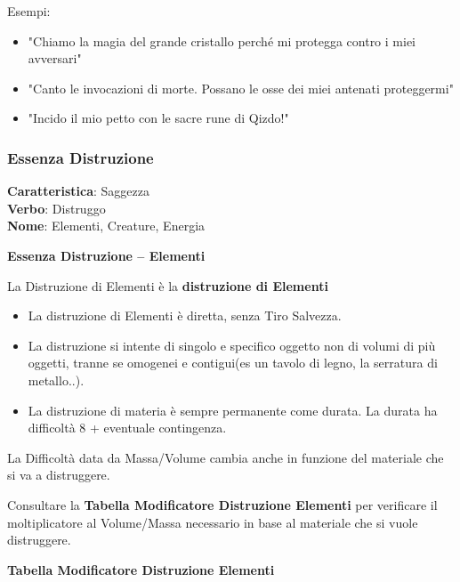 \documentclass[a4paper,10 pt,twoside,openany]{book}
\begin{document}
\bigskip

Esempi:
\begin{itemize}
	\item
	"Chiamo la magia del grande cristallo perché mi protegga contro i miei avversari"
	\item
	"Canto le invocazioni di morte. Possano le osse dei miei antenati proteggermi"
	\item
	"Incido il mio petto con le sacre rune di Qizdo!"
\end{itemize}

\pagebreak

\subsubsection{Essenza Distruzione}

\textbf{Caratteristica}: Saggezza\\
\textbf{Verbo}: Distruggo\\
\textbf{Nome}: Elementi, Creature, Energia\\

\label{essenza-distruzione---volonta}

\textbf{Essenza Distruzione -- Elementi}

La Distruzione di Elementi è la \textbf{distruzione di Elementi}
\begin{itemize}
	\item
	La distruzione di Elementi è diretta, senza Tiro Salvezza.
	\item
	La distruzione si intente di singolo e specifico oggetto non di volumi di più oggetti, tranne se omogenei e contigui(es un tavolo di legno, la serratura di metallo..).
	\item
	La distruzione di materia è sempre permanente come durata. La durata ha difficoltà 8 + eventuale contingenza.
\end{itemize}

\bigskip

La Difficoltà data da Massa/Volume cambia anche in funzione del materiale che si va a distruggere.

\bigskip

Consultare la \textbf{Tabella Modificatore Distruzione Elementi} per verificare il moltiplicatore al Volume/Massa necessario in base al materiale che si vuole distruggere.

\bigskip

\textbf{Tabella Modificatore Distruzione Elementi}
\end{document}
